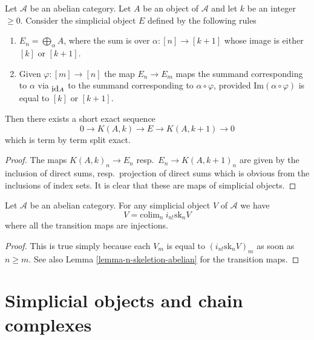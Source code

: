 \begin{lemma}
\label{lemma-extension}
Let $\mathcal{A}$ be an abelian category.
Let $A$ be an object of $\mathcal{A}$ and
let $k$ be an integer $\geq 0$. Consider the
simplicial object $E$ defined by the following rules
\begin{enumerate}
\item $E_n = \bigoplus_\alpha A$, where the 
sum is over $\alpha : [n] \to [k + 1]$ whose
image is either $[k]$ or $[k + 1]$.
\item Given $\varphi : [m] \to [n]$ the map
$E_n \to E_m$ maps the summand corresponding
to $\alpha$ via $\txt{id}_A$ to the summand
corresponding to $\alpha \circ \varphi$,
provided $\text{Im}(\alpha \circ \varphi)$
is equal to $[k]$ or $[k + 1]$.
\end{enumerate}
Then there exists a short exact sequence
$$
0 \to K(A, k) \to E \to K(A, k + 1) \to 0
$$
which is term by term split exact.
\end{lemma}

\begin{proof}
The maps $K(A, k)_n \to E_n$ resp.\ $E_n \to K(A, k + 1)_n$
are given by the inclusion of direct sums, resp.\ projection
of direct sums which is obvious from the inclusions of index
sets. It is clear that these are maps of simplicial
objects.
\end{proof}

\begin{lemma}
\label{lemma-abelian-limit-skeleta}
Let $\mathcal{A}$ be an abelian category.
For any simplicial object $V$ of $\mathcal{A}$ we have
$$
V = \text{colim}_n\ i_{n!}\text{sk}_n V
$$
where all the transition maps are injections.
\end{lemma}

\begin{proof}
This is true simply because each $V_m$ is
equal to $(i_{n!}\text{sk}_n V)_m$ as
soon as $n \geq m$. See also Lemma \ref{lemma-n-skeletion-abelian}
for the transition maps.
\end{proof}

\section{Simplicial objects and chain complexes}
\label{section-complexes}

